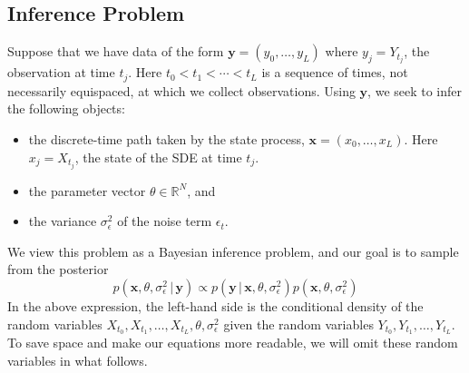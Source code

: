 \documentclass[wcp]{jmlr}
\begin{document}
\subsection{Inference Problem}
Suppose that we have data of the form $\mathbf{y} = (y_0, \ldots,
y_L)$ where $y_j = Y_{t_j}$, the observation at time $t_j$.  Here 
$t_0 < t_1 < \cdots < t_L$ is a sequence of times, not necessarily
equispaced, at which we collect observations.
Using $\mathbf{y}$, we seek to infer the following objects:
\begin{itemize}
\item the discrete-time path taken by the state process, $\mathbf{x} =
  (x_0, \ldots, x_L)$.  Here $x_j = X_{t_j}$, the state of the SDE at
  time $t_j$.
\item the parameter vector $\theta \in \mathbb{R}^N$, and 
\item the variance $\sigma_\epsilon^2$ of the noise term $\epsilon_t$.
\end{itemize}

We view this problem as a Bayesian inference problem, and our goal is
to sample from the posterior
\begin{equation}
\label{eqn:post1}
p(\mathbf{x}, \theta, \sigma_\epsilon^2 \, | \, \mathbf{y}) 
\propto p( \mathbf{y} \, | \, \mathbf{x}, \theta, \sigma_\epsilon^2 )
p(\mathbf{x}, \theta, \sigma_\epsilon^2)
\end{equation}
In the above expression, the left-hand side is the conditional density
of the random variables $X_{t_0}, X_{t_1}, \ldots, X_{t_L}, \theta,
\sigma_\epsilon^2$ given the random variables $Y_{t_0}, Y_{t_1},
  \ldots, Y_{t_L}$.  To save space and make our equations more
  readable, we will omit these random variables in what follows.
\end{document}
